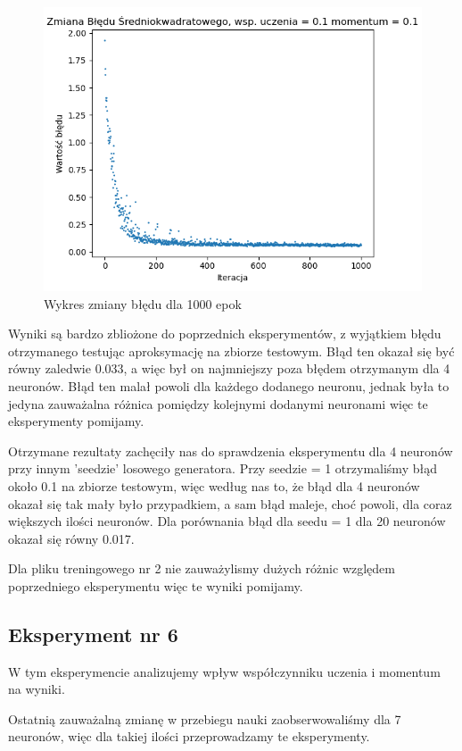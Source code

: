 \documentclass[12pt]{article}
\begin{document}
\begin{figure}[!htb]
 \centering
 \includegraphics[width=12cm]{ZmianaBledu20Neuron.png}
 \vspace{-0.3cm}
 \caption{Wykres zmiany błędu dla 1000 epok}
 \label{WykresBlad7}
\end{figure}


\newpage
Wyniki są bardzo zbliożone do poprzednich eksperymentów, z wyjątkiem błędu otrzymanego testując aproksymację na zbiorze testowym. Błąd ten okazał się być równy zaledwie 0.033, a więc był on najmniejszy poza błędem otrzymanym dla 4 neuronów. Błąd ten malał powoli dla każdego dodanego neuronu, jednak była to jedyna zauważalna różnica pomiędzy kolejnymi dodanymi neuronami więc te eksperymenty pomijamy.

Otrzymane rezultaty zachęciły nas do sprawdzenia eksperymentu dla 4 neuronów przy innym 'seedzie' losowego generatora. Przy seedzie = 1 otrzymaliśmy błąd około 0.1 na zbiorze testowym, więc według nas to, że błąd dla 4 neuronów okazał się tak mały było przypadkiem, a sam błąd maleje, choć powoli, dla coraz większych ilości neuronów. Dla porównania błąd dla seedu = 1 dla 20 neuronów okazał się równy 0.017.

Dla pliku treningowego nr 2 nie zauważylismy dużych różnic względem poprzedniego eksperymentu więc te wyniki pomijamy.
\newpage

\subsection{Eksperyment nr 6}
W tym eksperymencie analizujemy wpływ współczynniku uczenia i momentum na wyniki.

Ostatnią zauważalną zmianę w przebiegu nauki zaobserwowaliśmy dla 7 neuronów, więc dla takiej ilości przeprowadzamy te eksperymenty.
\end{document}
